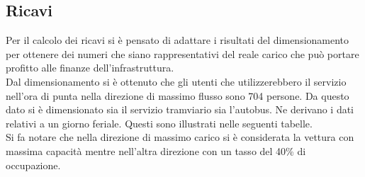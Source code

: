 \documentclass{article}
\begin{document}
\subsection{Ricavi}
Per il calcolo dei ricavi si è pensato di adattare i risultati del dimensionamento per ottenere dei numeri che siano rappresentativi del reale carico che può portare profitto alle finanze dell’infrastruttura.\\
Dal dimensionamento si è ottenuto che gli utenti che utilizzerebbero il servizio nell’ora di punta nella direzione di massimo flusso sono 704 persone. Da questo dato si è dimensionato sia il servizio tramviario sia l’autobus.  Ne derivano i dati relativi a un giorno feriale. Questi sono illustrati nelle seguenti tabelle. \\
Si fa notare che nella direzione di massimo carico si è considerata la vettura con massima capacità mentre nell’altra direzione con un tasso del 40\% di occupazione.\\
\end{document}
